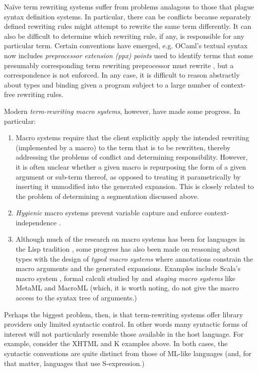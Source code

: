 \documentclass[acmlarge,review,anonymous]{acmart}\settopmatter{printfolios=true}
\begin{document}
Na\"ive term rewriting systems suffer from problems analagous to those that plague syntax definition systems. In particular, there can be conflicts because separately defined rewriting rules might attempt to rewrite the same term differently. It can also be difficult to determine which rewriting rule, if any, is responsible for any particular term. Certain conventions have emerged, e.g. OCaml's textual syntax now includes \emph{preprocessor extension (ppx) points} used to identify terms that some presumably corresponding term rewriting preprocessor must rewrite \cite{ocaml-manual}, but a correspondence is not enforced. In any case, it is difficult to reason abstractly about types and binding given a program subject to a large number of context-free rewriting rules. 

Modern \emph{term-rewriting macro systems}, however, have made some progress. In particular:
\begin{enumerate}[nolistsep]
\item Macro systems require that the client explicitly apply the intended rewriting (implemented by a macro) to the term that is to be rewritten, thereby addressing the problems of conflict and determining responsibility. However, it is often unclear whether a given macro  is repurposing the form of a given argument or sub-term thereof, as opposed to treating it parametrically by inserting it unmodified into the generated expansion. This is closely related to the problem of determining a {segmentation} discussed above.
\item \emph{Hygienic} macro systems prevent variable {capture} and enforce {context-independence} \cite{Kohlbecker86a,DBLP:conf/popl/Adams15,DBLP:conf/popl/ClingerR91,DBLP:journals/lisp/DybvigHB92}.
\item Although much of the research on macro systems has been for languages in the Lisp tradition \cite{mccarthy1978history}, some progress has also been made on reasoning about types with the design of \emph{typed macro systems} where annotations constrain the macro arguments and the generated expansions. Examples include Scala's macro system \cite{ScalaMacros2013}, formal calculi studied by \citet{DBLP:conf/esop/HermanW08} and \emph{staging macro systems} like MetaML \cite{Sheard:1999:UMS} and MacroML \cite{ganz2001macros} (which, it is worth noting, do not give the macro access to the syntax tree of arguments.)
\end{enumerate}

Perhaps the biggest problem, then, is that term-rewriting systems offer library providers only limited syntactic control. In other words many syntactic forms of interest will not particularly resemble those available in the host language. For example, consider the  XHTML and K examples above. In both cases, the syntactic conventions are quite distinct from those of ML-like languages (and, for that matter, languages that use S-expression.) 
\end{document}
